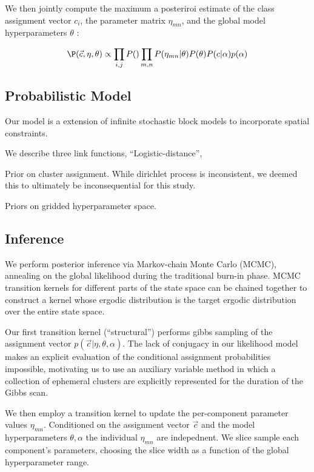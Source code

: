 \documentclass{article}
\begin{document}
We then jointly compute the maximum a posteriroi estimate of the class
assignment vector ${c_i}$, the parameter matrix $\eta_{mn}$, and the
global model hyperparameters $\theta$ :

\begin{equation}
  \P(\vec{c}, \eta, \theta) \propto \prod_{i, j} P() \prod_{m, n} P(\eta_{mn} | \theta)  P(\theta) P(c | \alpha) p(\alpha) 
\end{equation}



\subsection{Probabilistic Model}

Our model is a extension of infinite stochastic block models
\cite{Kemp, other guys} to incorporate spatial constraints.

We describe three link functions, ``Logistic-distance'', 

Prior on cluster assignment. While dirichlet process is inconsistent,
we deemed this to ultimately be inconsequential for this study.

Priors on gridded hyperparameter space. 



\subsection{Inference} 
We perform posterior inference via Markov-chain Monte Carlo (MCMC),
annealing on the global likelihood during the traditional burn-in
phase. MCMC transition kernels for different parts of the state space
can be chained together to construct a kernel whose ergodic
distribution is the target ergodic distribution over the entire state space. 

Our first transition kernel (``structural'') performs gibbs sampling 
of the assignment vector $p(\vec{c} | \eta, \theta, \alpha)$. 
The lack of conjugacy in our likelihood model makes an explicit 
evaluation of the conditional assignment probabilities impossible, 
motivating us to use an auxiliary variable method \autocite{Neal}
in which a collection of ephemeral clusters are explicitly represented
for the duration of the Gibbs scan. 

We then employ a transition kernel to update the per-component
parameter values $\eta_{mn}$. Conditioned on the assignment vector
$\vec{c}$ and the model hyperparameters $\theta, \alpha$ the 
individual $\eta_{mn}$ are indepednent. We slice sample \autocite{neal}
each component's parameters, choosing the slice width as a function
of the global hyperparameter range. 
\end{document}
